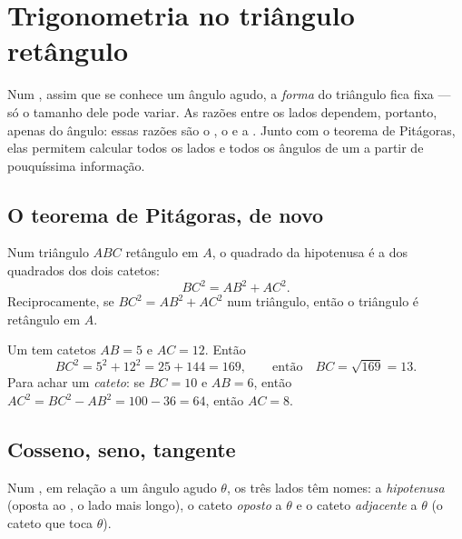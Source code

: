 \chapter{Trigonometria no triângulo retângulo}\label{ch:g9:trig}

Num , assim que se conhece um ângulo agudo, a
\emph{forma} do triângulo fica fixa --- só o tamanho dele pode variar.
As razões entre os lados dependem, portanto, apenas do ângulo: essas
razões são o , o  e a . Junto com o teorema de
Pitágoras, elas permitem calcular todos os lados e todos os ângulos de
um  a partir de pouquíssima informação.

\section{O teorema de Pitágoras, de novo}

\begin{theorem}[Pitágoras]\label{thm:g9:trig:pythagoras}
Num triângulo $ABC$ retângulo em $A$, o quadrado da hipotenusa é a 
dos quadrados dos dois catetos:
\[
BC^2 = AB^2 + AC^2 .
\]
Reciprocamente, se $BC^2 = AB^2 + AC^2$ num triângulo, então o
triângulo é retângulo em $A$.
\end{theorem}
\admitted

\begin{example}\label{ex:g9:trig:pythagoras}
Um  tem catetos $AB = 5$ e $AC = 12$. Então
\[
BC^2 = 5^2 + 12^2 = 25 + 144 = 169,
\qquad\text{então}\quad BC = \sqrt{169} = 13 .
\]
Para achar um \emph{cateto}: se $BC = 10$ e $AB = 6$, então
$AC^2 = BC^2 - AB^2 = 100 - 36 = 64$, então $AC = 8$.
\end{example}

\section{Cosseno, seno, tangente}

Num , em relação a um ângulo agudo $\theta$, os três
lados têm nomes: a \emph{hipotenusa} (oposta ao , o lado
mais longo), o cateto \emph{oposto} a $\theta$ e o cateto
\emph{adjacente} a $\theta$ (o cateto que toca $\theta$).

